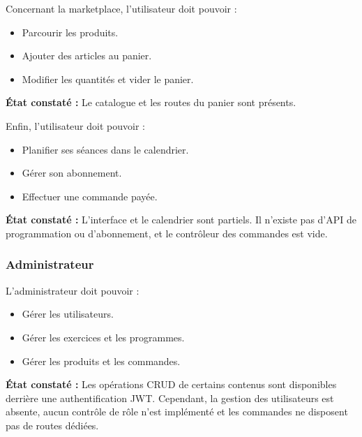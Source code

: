 ﻿\documentclass[12pt,a4paper]{report}
\begin{document}
Concernant la marketplace, l'utilisateur doit pouvoir :
\begin{itemize}
    \item Parcourir les produits.
    \item Ajouter des articles au panier.
    \item Modifier les quantités et vider le panier.
\end{itemize}
\textbf{État constaté :} Le catalogue et les routes du panier sont présents.

Enfin, l'utilisateur doit pouvoir :
\begin{itemize}
    \item Planifier ses séances dans le calendrier.
    \item Gérer son abonnement.
    \item Effectuer une commande payée.
\end{itemize}
\textbf{État constaté :} L'interface et le calendrier sont partiels. Il n'existe pas d'API de programmation ou d'abonnement, et le contrôleur des commandes est vide.

\subsubsection{Administrateur}

L'administrateur doit pouvoir :
\begin{itemize}
    \item Gérer les utilisateurs.
    \item Gérer les exercices et les programmes.
    \item Gérer les produits et les commandes.
\end{itemize}
\textbf{État constaté :} Les opérations CRUD de certains contenus sont disponibles derrière une authentification JWT. Cependant, la gestion des utilisateurs est absente, aucun contrôle de rôle n'est implémenté et les commandes ne disposent pas de routes dédiées.
\end{document}
